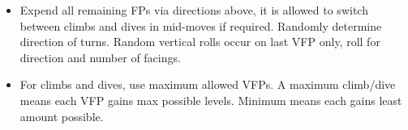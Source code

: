 \begin{onecolumntable}
\begin{tablenote}{\linewidth}
\begin{itemize}
    \item Expend all remaining FPs via directions above, it is allowed to switch between climbs and dives in mid-moves if required. Randomly determine direction of turns. Random vertical rolls occur on last VFP only, roll for direction and number of facings.
    \item For climbs and dives, use maximum allowed VFPs. A maximum climb/dive means each VFP gains max possible levels. Minimum means each gains least amount possible.
\end{itemize}
\end{tablenote}
\end{onecolumntable}
